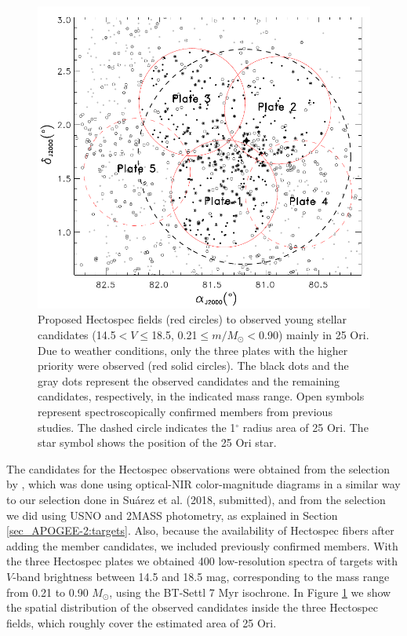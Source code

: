 \documentclass[12pt]{article}
\newcounter{subsubsubsection}[subsubsection]
\begin{document}
\begin{figure}[ht!]
	\includegraphics[width=1.0\textwidth]{sky_MMT.pdf}
	\caption[Plate design for the Hectospec observations.]{Proposed Hectospec fields (red circles) to observed young stellar candidates (14.5$<V\leq$18.5, 0.21$\leq m/M_\odot <$0.90) mainly in 25 Ori. Due to weather conditions, only the three plates with the higher priority were observed (red solid circles). The black dots and the gray dots represent the observed candidates and the remaining candidates, respectively, in the indicated mass range. Open symbols represent spectroscopically confirmed members from previous studies. The dashed circle indicates the 1$^\circ$ radius area of 25 Ori. The star symbol shows the position of the 25 Ori star.}
	\label{fig:sky_MMT}
\end{figure}

\label{sec_Hectospec:targets}
The candidates for the Hectospec observations were obtained from the selection by \citet{Downes2014}, which was done using optical-NIR color-magnitude diagrams in a similar way to our selection done in Su\'arez et al. (2018, submitted), and from the selection we did using USNO and 2MASS photometry, as explained in Section \ref{sec_APOGEE-2:targets}. Also, because the availability of Hectospec fibers after adding the member candidates, we included previously confirmed members. With the three Hectospec plates we obtained 400 low-resolution spectra of targets with $V$-band brightness between 14.5 and 18.5 mag, corresponding to the mass range from 0.21 to 0.90 $M_\odot$, using the BT-Settl 7 Myr isochrone. In Figure \ref{fig:sky_MMT} we show the spatial distribution of the observed candidates inside the three Hectospec fields, which roughly cover the estimated area of 25 Ori.
\end{document}
